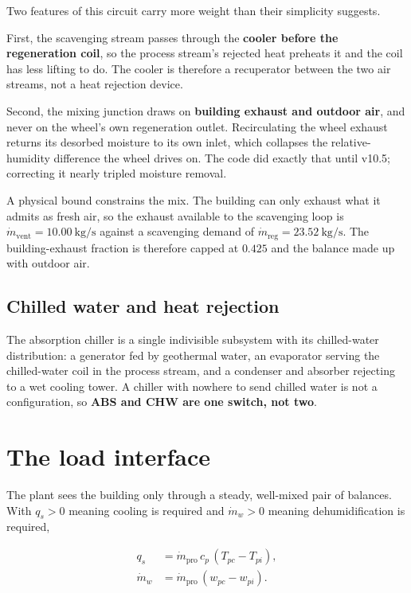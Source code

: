 \documentclass[11pt]{article}
\newcommand{\mdp}{\ensuremath{\dot m_{\mathrm{pro}}}}
\newcommand{\mdr}{\ensuremath{\dot m_{\mathrm{reg}}}}
\newcommand{\mdv}{\ensuremath{\dot m_{\mathrm{vent}}}}
\newcommand{\mdw}{\ensuremath{\dot m_{w}}}
\newcommand{\qs}{\ensuremath{q_{s}}}
\begin{document}
Two features of this circuit carry more weight than their simplicity suggests.

First, the scavenging stream passes through the \textbf{cooler before the
regeneration coil}, so the process stream's rejected heat preheats it and the
coil has less lifting to do. The cooler is therefore a recuperator between the
two air streams, not a heat rejection device.

Second, the mixing junction draws on \textbf{building exhaust and outdoor
air}, and never on the wheel's own regeneration outlet. Recirculating the
wheel exhaust returns its desorbed moisture to its own inlet, which collapses
the relative-humidity difference the wheel drives on. The code did exactly
that until v10.5; correcting it nearly tripled moisture removal.

A physical bound constrains the mix. The building can only exhaust what it
admits as fresh air, so the exhaust available to the scavenging loop is
$\mdv = \SI{10.00}{\kilogram\per\second}$ against a scavenging demand
of $\mdr = \SI{23.52}{\kilogram\per\second}$. The building-exhaust
fraction is therefore capped at $0.425$ and the balance made up with
outdoor air.

\subsection{Chilled water and heat rejection}

The absorption chiller is a single indivisible subsystem with its
chilled-water distribution: a generator fed by geothermal water, an evaporator
serving the chilled-water coil in the process stream, and a condenser and
absorber rejecting to a wet cooling tower. A chiller with nowhere to send
chilled water is not a configuration, so \textbf{ABS and CHW are one switch,
not two}.

\section{The load interface}

The plant sees the building only through a steady, well-mixed pair of balances.
With $\qs > 0$ meaning cooling is required and $\mdw > 0$ meaning
dehumidification is required,

\begin{align}
\qs   &= \mdp\, c_p \,(T_{pc} - T_{pi}), \label{eq:sens}\\
\mdw  &= \mdp\, (w_{pc} - w_{pi}). \label{eq:lat}
\end{align}
\end{document}
